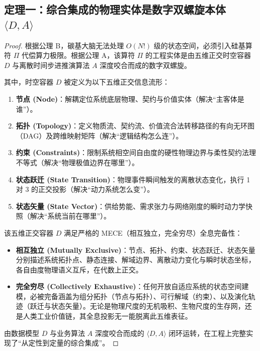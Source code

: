 \documentclass[11pt,a4paper]{article}
\begin{document}
\subsection*{定理一：综合集成的物理实体是数字双螺旋本体 $\langle D,A \rangle$}
\begin{proof}
根据公理 B，碳基大脑无法处理 $O(N!)$ 级的状态空间，必须引入硅基算符 $\Pi$ 代偿算力极限。根据公理 A，该算符 $\Pi$ 的工程实体是由五维正交时空容器 $D$ 与离散时间步进推演算法 $A$ 深度咬合而成的数字双螺旋。

其中，时空容器 $D$ 被定义为以下五维正交信息流形：
\begin{enumerate}
    \item \textbf{节点 (Node)}：解耦定位系统底层物理、契约与价值实体（解决“主客体是谁”）。
    \item \textbf{拓扑 (Topology)}：定义物质流、契约流、价值流合法转移路径的有向无环图（DAG）及跨维映射矩阵（解决“逻辑结构怎么连”）。
    \item \textbf{约束 (Constraints)}：限制系统相空间自由度的硬性物理边界与柔性契约法理不等式（解决“物理极值边界在哪里”）。
    \item \textbf{状态跃迁 (State Transition)}：物理事件瞬间触发的离散状态变化，执行 1 对 3 的正交投影（解决“动力系统怎么变”）。
    \item \textbf{状态矢量 (State Vector)}：供给势能、需求张力与网络刚度的瞬时动力学快照（解决“系统当前在哪里”）。
\end{enumerate}

该五维正交容器 $D$ 满足严格的 MECE（相互独立，完全穷尽）全息完备性：
\begin{itemize}
    \item \textbf{相互独立 (Mutually Exclusive)}：节点、拓扑、约束、状态跃迁、状态矢量分别描述系统拓扑点、静态连接、解域边界、离散动力变化与瞬时状态坐标，各自由度物理语义互斥，在代数上正交。
    \item \textbf{完全穷尽 (Collectively Exhaustive)}：任何开放自适应系统的状态空间建模，必被完备涵盖为组分拓扑（节点与拓扑）、可行解域（约束）、以及演化轨迹（跃迁与状态矢量）。无论是物理尺度的无机吸积、生物尺度的生存网，还是人类工业价值链，其全息投影无一能脱离此五维表征。
\end{itemize}
由数据模型 $D$ 与业务算法 $A$ 深度咬合而成的 $\langle D,A \rangle$ 闭环运转，在工程上完整实现了“从定性到定量的综合集成”。
\end{proof}
\end{document}
